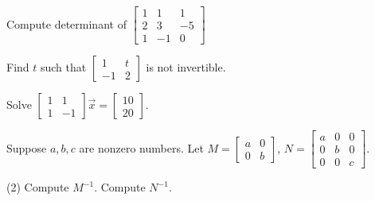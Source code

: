 \setcounter{exercise}{100}

\begin{exercise}
Compute determinant of
$\left[ \begin{smallmatrix}
1 & 1 & 1 \\
2 & 3 & -5 \\
1 & -1 & 0
\end{smallmatrix}\right]$
\end{exercise}

\begin{exercise}
Find $t$ such that
$\left[ \begin{smallmatrix}
1 & t \\
-1 & 2
\end{smallmatrix}\right]$
is not invertible.
\end{exercise}

\begin{exercise}
Solve
$\left[ \begin{smallmatrix}
1 & 1 \\
1 & -1
\end{smallmatrix}\right] \vec{x} = 
\left[ \begin{smallmatrix}
10 \\ 20
\end{smallmatrix}\right]$.
\end{exercise}

\begin{exercise}
Suppose $a, b, c$ are nonzero numbers.
Let
$M=\left[ \begin{smallmatrix}
a & 0 \\
0 & b
\end{smallmatrix}\right]$,
$N=\left[ \begin{smallmatrix}
a & 0 & 0 \\
0 & b & 0 \\
0 & 0 & c
\end{smallmatrix}\right]$.
\begin{tasks}(2)
\task Compute $M^{-1}$.
\task Compute $N^{-1}$.
\end{tasks}
\end{exercise}

